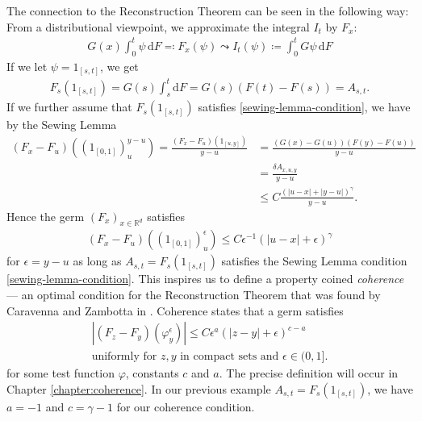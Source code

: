 The connection to the Reconstruction Theorem can be seen in the following way: From a distributional viewpoint, we approximate the integral $I_t$ by $F_x$: 
\begin{align*}
    G(x)\int^t_0 \psi \, \mathrm{d}F \eqqcolon F_x(\psi)  \leadsto I_t(\psi) \coloneqq \int^t_0 G \psi \, \mathrm{d}F
\end{align*}
If we let $\psi = 1_{[s,t]}$, we get
\begin{align*}
    F_s(1_{[s,t]}) = G(s) \int^t_s \mathrm{d}F = G(s)(F(t) - F(s)) = A_{s,t}.
\end{align*}
If we further assume that $F_s(1_{[s,t]})$ satisfies \eqref{sewing-lemma-condition}, we have by the Sewing Lemma
\begin{align*}
    (F_x - F_u)((1_{[0,1]})^{y-u}_u) = \frac{(F_x - F_u)(1_{[u,y]})}{y-u} &= \frac{(G(x) - G(u))(F(y) - F(u))}{y-u} \\
    &= \frac{\delta A_{x,u,y}}{y-u}\\
    &\leq C \frac{ (|u-x| + |y-u|)^\gamma}{y-u}.
\end{align*} 
Hence the germ $(F_x)_{x \in \mathbb{R}^d}$ satisfies 
\begin{align*}
    (F_x - F_u)((1_{[0,1]})^{\epsilon}_u) \leq C \epsilon^{-1}(|u-x| + \epsilon)^\gamma
\end{align*}
for $\epsilon = y-u$ as long as $A_{s,t} = F_s(1_{[s,t]})$ satisfies the Sewing Lemma condition \eqref{sewing-lemma-condition}. This inspires us to define a property coined \emph{coherence} --- an optimal condition for the Reconstruction Theorem that was found by Caravenna and Zambotta in \cite{caravenna2021hairer}. Coherence states that a germ satisfies
\begin{gather}\label{pre-condition-coherence}
    |(F_z - F_y)(\varphi^\epsilon_y)| \leq C\epsilon^{a}(|z-y| + \epsilon)^{c - a}  \\ \text{uniformly for $z,y$ in compact sets and $\epsilon \in (0,1]$} \nonumber.
\end{gather}
for some test function $\varphi$, constants  $c$ and $a$.
The precise definition will occur in Chapter \ref{chapter:coherence}. In our previous example $A_{s,t} = F_s(1_{[s,t]})$, we have $a = -1$ and $c = \gamma - 1$ for our coherence condition. 

